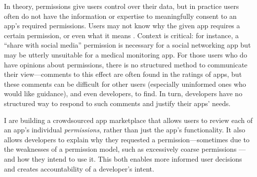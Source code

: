 \documentclass[11pt]{article}
\begin{document}
In theory, permissions give users control over their 
data, but in practice users often do not have the 
information or expertise to meaningfully consent to an 
app's required permissions. Users may not
know why the given app requires a certain permission, or
even what it means \cite{android-attention-SOUPS12}. 
Context is critical:
for instance, 
a ``share with social media'' permission is necessary for a social
networking app but may be utterly
unsuitable for a medical monitoring app. 
For those users who do have opinions about permissions, 
there is no structured method to
communicate their view---comments to this effect are often found in
the ratings of apps, but these comments can be difficult for other
users (especially uninformed ones who would like guidance), and even
developers, to find. In turn, developers have no structured way to
respond to such comments and justify their apps' needs.

I are building a crowdsourced app marketplace that allows users to review
each of an app's individual \emph{permissions}, rather than just the app's functionality. 
It also allows developers to
explain why they requested a permission---sometimes due to the
weaknesses of a permission model, such as excessively coarse permissions
\cite{permission-tracking-UBICOMM12}---and how they intend to use it. This both enables more
informed user decisions and creates accountability of a developer's intent.


\end{document}
